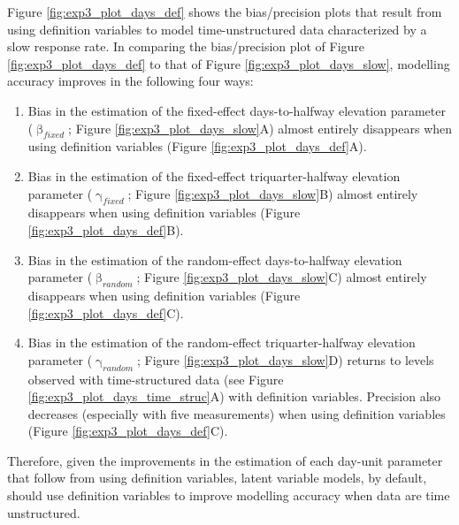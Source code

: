 \documentclass[
12pt, %
twoside,
english]{guelphthesis}
\begin{document}
Figure \ref{fig:exp3_plot_days_def} shows the bias/precision plots that result from using definition variables to model time-unstructured data characterized by a slow response rate. In comparing the bias/precision plot of Figure \ref{fig:exp3_plot_days_def} to that of Figure \ref{fig:exp3_plot_days_slow}, modelling accuracy improves in the following four ways:
\begin{enumerate}
\def\labelenumi{\arabic{enumi})}
\tightlist
\item
  Bias in the estimation of the fixed-effect days-to-halfway elevation parameter (\(\upbeta_{fixed}\); Figure \ref{fig:exp3_plot_days_slow}A) almost entirely disappears when using definition variables (Figure \ref{fig:exp3_plot_days_def}A).
\item
  Bias in the estimation of the fixed-effect triquarter-halfway elevation parameter (\(\upgamma_{fixed}\); Figure \ref{fig:exp3_plot_days_slow}B) almost entirely disappears when using definition variables (Figure \ref{fig:exp3_plot_days_def}B).
\item
  Bias in the estimation of the random-effect days-to-halfway elevation parameter (\(\upbeta_{random}\); Figure \ref{fig:exp3_plot_days_slow}C) almost entirely disappears when using definition variables (Figure \ref{fig:exp3_plot_days_def}C).
\item
  Bias in the estimation of the random-effect triquarter-halfway elevation parameter (\(\upgamma_{random}\); Figure \ref{fig:exp3_plot_days_slow}D) returns to levels observed with time-structured data (see Figure \ref{fig:exp3_plot_days_time_struc}A) with definition variables. Precision also decreases (especially with five measurements) when using definition variables (Figure \ref{fig:exp3_plot_days_def}C).
\end{enumerate}
\noindent Therefore, given the improvements in the estimation of each day-unit parameter that follow from using definition variables, latent variable models, by default, should use definition variables to improve modelling accuracy when data are time unstructured.
\end{document}
